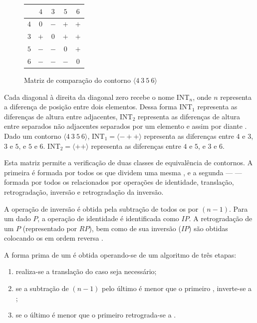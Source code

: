 \begin{figure}
  \centering
  \begin{tabular}{r|cccc}
    & $4$ & $3$ & $5$ & $6$ \\
    \hline
    $4$ & $0$ & $-$ & $+$ & $+$ \\
    $3$ & $+$ & $0$ & $+$ & $+$ \\
    $5$ & $-$ & $-$ & $0$ & $+$ \\
    $6$ & $-$ & $-$ & $-$ & $0$ \\
  \end{tabular}
  \caption{Matriz de comparação do contorno $\langle 4\:3\:5\:6 \rangle$}
  \label{fig:matriz-4356}
\end{figure}

Cada diagonal à direita da diagonal zero recebe o nome INT$_n$, onde
$n$ representa a diferença de posição entre dois elementos. Dessa
forma INT$_1$ representa as diferenças de altura entre 
adjacentes, INT$_2$ representa as diferenças de altura entre
 separados não adjacentes separados por um elemento e
assim por diante \cite[p. 231]{marvin.ea87:relating}. Dado um contorno
$\langle 4\:3\:5\:6 \rangle$, INT$_1 = \langle - + +\rangle$
representa as diferenças entre $4$ e $3$, $3$ e $5$, e $5$ e
$6$. INT$_2 = \langle + + \rangle$ representa as diferenças entre $4$
e $5$, e $3$ e $6$.

Esta matriz permite a verificação de duas classes de equivalência de
contornos. A primeira é formada por todos os  que dividem
uma mesma , e a segunda ---
 --- formada por todos os  relacionados
por operações de identidade, translação, retrogradação, inversão e
retrogradação da inversão.

A operação de inversão é obtida pela subtração de todos os
 por $(n-1)$. Para um dado  $P$, a
operação de identidade é identificada como $IP$. A retrogradação de um
 $P$ (representado por $RP$), bem como de sua inversão
($IP$) são obtidas colocando os  em ordem reversa
\cite[p. 231]{marvin.ea87:relating}.

A forma prima de um  é obtida operando-se de um
algoritmo de três etapas:
\begin{enumerate}
\item realiza-se a translação do  caso seja necessário;
\item se a subtração de $(n-1)$ pelo último  é menor
  que o primeiro , inverte-se a ;
\item se o último  é menor que o primeiro
   retrograda-se a .
\end{enumerate}


